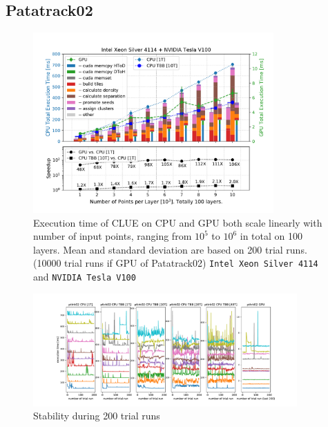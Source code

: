 
\newpage

\subsection{Patatrack02}
\begin{figure}[ht!]
    \centering
    \includegraphics[width=0.82\textwidth]{chapters/HGCal/figures/clue/private/Figure5_patatrack02_1.pdf}
    \caption{ Execution time of CLUE on CPU and GPU both scale linearly with number of input points, ranging from $10^5$ to $10^6$ in total on 100 layers.  Mean and standard deviation are based on 200 trial runs. (10000 trial runs if GPU of Patatrack02) \texttt{Intel Xeon Silver 4114} and \texttt{NVIDIA Tesla V100}}
\end{figure}
\begin{figure}[ht!]
    \centering
    \includegraphics[trim=3cm 0cm 3cm 0cm, clip,width=0.9\textwidth]{chapters/HGCal/figures/clue/private/addition_pttrk02.pdf}
    \caption{Stability during 200 trial runs}
\end{figure}


\newpage

